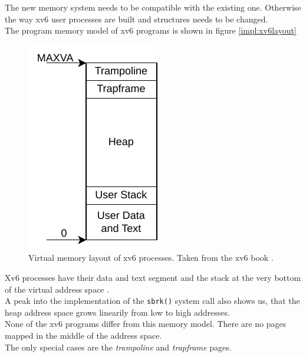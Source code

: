 

The new memory system needs to be compatible with the existing one. Otherwise the way xv6
user processes are built and structures needs to be changed.\\
The program memory model of xv6 programs is shown in figure \ref{impl:xv6layout}

\begin{figure}[t!]
    \centering
    \includegraphics[scale=.5]{figures/prog_vm.pdf}
    \caption[xv6 memory layout]{Virtual memory layout of xv6 processes. Taken from the xv6 book \cite{cox2011xv6}.}
    \label{impl:proclayout}
\end{figure}

Xv6 processes have their data and text segment and the stack at the very bottom of the virtual
address space \cite{cox2011xv6}.\\
A peak into the implementation of the \texttt{sbrk()} system call also shows us, that the heap
address space grows linearily from low to high addresses.\\
None of the xv6 programs differ from this memory model. There are no pages mapped in the
middle of the address space.\\
The only special cases are the \textit{trampoline} and \textit{trapframe} pages.

